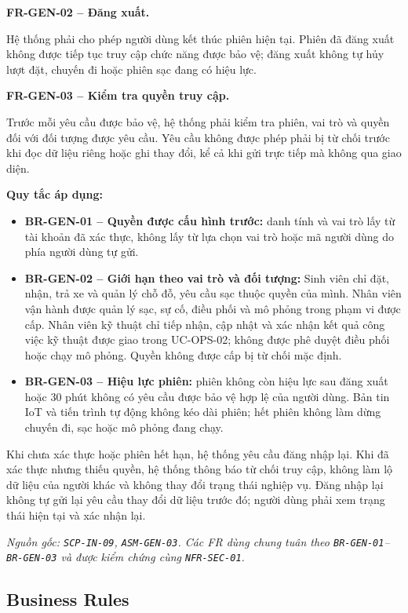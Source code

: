 \medskip
\noindent\textbf{FR-GEN-02 -- Đăng xuất.}\par
\nopagebreak[4]
Hệ thống phải cho phép người dùng kết thúc phiên hiện tại. Phiên đã đăng xuất không được tiếp tục truy cập chức năng được bảo vệ; đăng xuất không tự hủy lượt đặt, chuyến đi hoặc phiên sạc đang có hiệu lực.

\medskip
\noindent\textbf{FR-GEN-03 -- Kiểm tra quyền truy cập.}\par
\nopagebreak[4]
Trước mỗi yêu cầu được bảo vệ, hệ thống phải kiểm tra phiên, vai trò và quyền đối với đối tượng được yêu cầu. Yêu cầu không được phép phải bị từ chối trước khi đọc dữ liệu riêng hoặc ghi thay đổi, kể cả khi gửi trực tiếp mà không qua giao diện.

\medskip
\noindent\textbf{Quy tắc áp dụng:}
\begin{itemize}
  \item \textbf{BR-GEN-01 -- Quyền được cấu hình trước:} danh tính và vai trò lấy từ tài khoản đã xác thực, không lấy từ lựa chọn vai trò hoặc mã người dùng do phía người dùng tự gửi.
  \item \textbf{BR-GEN-02 -- Giới hạn theo vai trò và đối tượng:} Sinh viên chỉ đặt, nhận, trả xe và quản lý chỗ đỗ, yêu cầu sạc thuộc quyền của mình. Nhân viên vận hành được quản lý sạc, sự cố, điều phối và mô phỏng trong phạm vi được cấp. Nhân viên kỹ thuật chỉ tiếp nhận, cập nhật và xác nhận kết quả công việc kỹ thuật được giao trong UC-OPS-02; không được phê duyệt điều phối hoặc chạy mô phỏng. Quyền không được cấp bị từ chối mặc định.
  \item \textbf{BR-GEN-03 -- Hiệu lực phiên:} phiên không còn hiệu lực sau đăng xuất hoặc 30 phút không có yêu cầu được bảo vệ hợp lệ của người dùng. Bản tin IoT và tiến trình tự động không kéo dài phiên; hết phiên không làm dừng chuyến đi, sạc hoặc mô phỏng đang chạy.
\end{itemize}

Khi chưa xác thực hoặc phiên hết hạn, hệ thống yêu cầu đăng nhập lại. Khi đã xác thực nhưng thiếu quyền, hệ thống thông báo từ chối truy cập, không làm lộ dữ liệu của người khác và không thay đổi trạng thái nghiệp vụ. Đăng nhập lại không tự gửi lại yêu cầu thay đổi dữ liệu trước đó; người dùng phải xem trạng thái hiện tại và xác nhận lại.

\textit{Nguồn gốc: \texttt{SCP-IN-09}, \texttt{ASM-GEN-03}. Các FR dùng chung tuân theo \texttt{BR-GEN-01}--\texttt{BR-GEN-03} và được kiểm chứng cùng \texttt{NFR-SEC-01}.}

\subsection{Business Rules}

